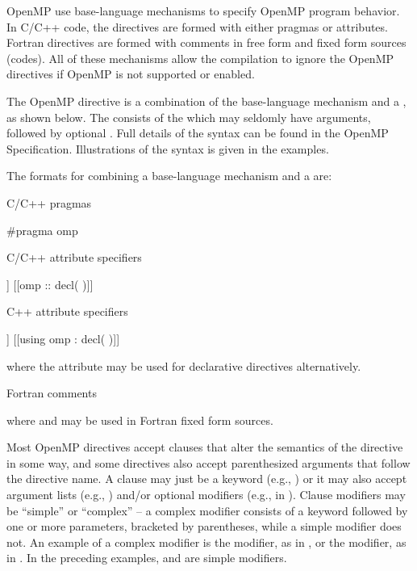 \label{chap:directive_syntax}

OpenMP  use base-language mechanisms to specify OpenMP program behavior.
In C/C++ code, the directives are formed with 
either pragmas or attributes.
Fortran directives are formed with comments in free form and fixed form sources (codes).
All of these mechanisms allow the compilation to ignore the OpenMP directives if
OpenMP is not supported or enabled.


The OpenMP directive is a combination of the base-language mechanism and a ,
as shown below. The  consists
of the  which may seldomly have arguments, 
followed by optional . Full details of the syntax can be found in the OpenMP Specification.
Illustrations of the syntax is given in the examples.

The formats for combining a base-language mechanism and a  are:

C/C++ pragmas
\begin{indentedcodelist}
#pragma omp 
\end{indentedcodelist}

C/C++ attribute specifiers
\begin{indentedcodelist}
[[omp :: directive( \plc{directive-specification} )]]
[[omp :: decl(  )]]
\end{indentedcodelist}

C++ attribute specifiers
\begin{indentedcodelist}
[[using omp : directive( \plc{directive-specification} )]]
[[using omp : decl(  )]]
\end{indentedcodelist}

where the  attribute may be used for declarative
directives alternatively.

Fortran comments

where  and  may be used in Fortran fixed form sources.

Most OpenMP directives accept clauses that alter the semantics of the directive in some way, 
and some directives also accept parenthesized arguments that follow the directive name. 
A clause may just be a keyword (e.g., ) or it may also accept argument lists 
(e.g., ) and/or optional modifiers (e.g.,  in 
).
Clause modifiers may be ``simple'' or ``complex'' -- a complex modifier consists of a
keyword followed by one or more parameters, bracketed by parentheses, while a simple 
modifier does not. An example of a complex modifier is the  modifier, 
as in , or the  modifier, as in 
. 
In the preceding examples,  and  are simple modifiers.

